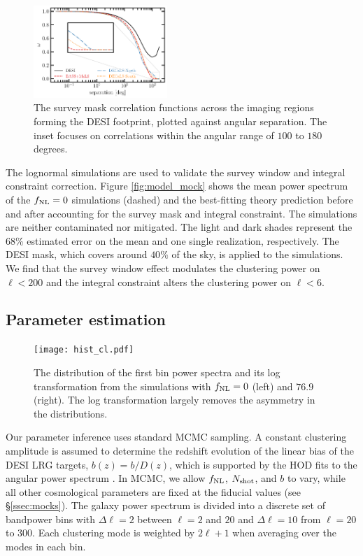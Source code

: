 \begin{figure}
    \centering
    \includegraphics[width=0.45\textwidth]{figures/mask_2pf.pdf}
    \caption{The survey mask correlation functions across the imaging regions forming the DESI footprint, plotted against angular separation. The inset focuses on correlations within the angular range of $100$ to $180$ degrees.}
    \label{fig:mask2pf}
\end{figure}



The lognormal simulations are used to validate the survey window and integral constraint correction. Figure \ref{fig:model_mock} shows the mean power spectrum of the $f_{\rm NL}=0$ simulations (dashed) and the best-fitting theory prediction before and after accounting for the survey mask and integral constraint. The simulations are neither contaminated nor mitigated. The light and dark shades represent the 68\% estimated error on the mean and one single realization, respectively. The DESI mask, which covers around $40\%$ of the sky, is applied to the simulations. We find that the survey window effect modulates the clustering power on $\ell < 200$ and the integral constraint alters the clustering power on $\ell < 6$.

\subsection{Parameter estimation}

\begin{figure}
\centering
\texttt{[image: hist\_cl.pdf]}
\caption{The distribution of the first bin power spectra and its log transformation from the simulations with $f_{\rm NL}=0$ (left) and $76.9$ (right). The log transformation largely removes the asymmetry in the distributions.}\label{fig:histcell}
\end{figure}

Our parameter inference uses standard MCMC sampling. A constant clustering amplitude is assumed to determine the redshift evolution of the linear bias of the DESI LRG targets, $b(z) = b/D(z)$, which is supported by the HOD fits to the angular power spectrum \citep{zhou2021clustering}. In MCMC, we allow $f_{\rm NL}$, $N_{\rm shot}$, and $b$ to vary, while all other cosmological parameters are fixed at the fiducial values (see \S \ref{ssec:mocks}). The galaxy power spectrum is divided into a discrete set of bandpower bins with $\Delta\ell=2$ between $\ell=2$ and $20$ and $\Delta \ell=10$ from $\ell=20$ to $300$. Each clustering mode is weighted by $2\ell+1$ when averaging over the modes in each bin.


